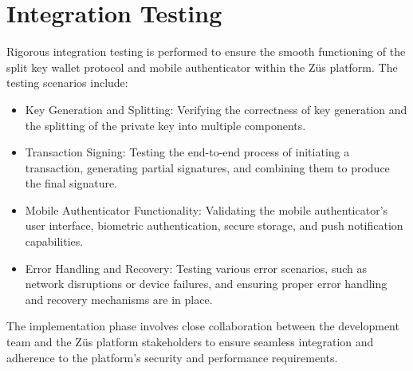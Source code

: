 \section{Integration Testing}
Rigorous integration testing is performed to ensure the smooth functioning of the split key wallet protocol and mobile authenticator within the Züs platform. The testing scenarios include:
\begin{itemize}
\item Key Generation and Splitting: Verifying the correctness of key generation and the splitting of the private key into multiple components.
\item Transaction Signing: Testing the end-to-end process of initiating a transaction, generating partial signatures, and combining them to produce the final signature.
\item Mobile Authenticator Functionality: Validating the mobile authenticator's user interface, biometric authentication, secure storage, and push notification capabilities.
\item Error Handling and Recovery: Testing various error scenarios, such as network disruptions or device failures, and ensuring proper error handling and recovery mechanisms are in place.
\end{itemize}
The implementation phase involves close collaboration between the development team and the Züs platform stakeholders to ensure seamless integration and adherence to the platform's security and performance requirements.
